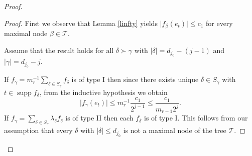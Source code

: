 \documentclass[a4paper]{amsart}
\theoremstyle{plain}
\newcommand{\mc}{\mathcal}
\newcommand{\fb}{f_{\beta}}
\newcommand{\fg}{f_{\gamma}}
\newcommand{\fd}{f_{\delta}}
\DeclareMathOperator{\supp}{supp}
\begin{document}
\begin{proof}
\begin{proof}
First we observe that Lemma \ref{linfty} yields $\vert \fb(e_t)\vert\leq c_{1}$ for every maximal node $\beta\in \mc{T}$.


Assume that the result holds for all $\delta\succ \gamma$ with  $\vert \delta\vert=d_{j_0}-(j-1)$
and $\vert \gamma\vert=d_{j_0}-j$.

If  $\fg=m_{r}^{-1}\sum_{\delta\in S_{\gamma}}\fd$ is of type I then since there exists
unique $\delta\in S_{\gamma}$ with $t\in\supp \fd$, from the inductive hypothesis we
obtain $$ \vert\fg(e_t)\vert\leq m_{r}^{-1}\frac{c_{1}}{2^{j-1}}\leq
\frac{c_{1}}{m_{r-1}2^{j}}.
$$
If $\fg=\sum_{\delta\in S_{\gamma}}\lambda_{\delta}\fd$ is of type II  then each $\fd$ is
of type I. This follows from our assumption  that every $\delta$ with
$\vert\delta\vert\leq d_{j_0}$ is not  a maximal node of the tree $\mc{T}$.


\end{proof}
\end{proof}
\end{document}
